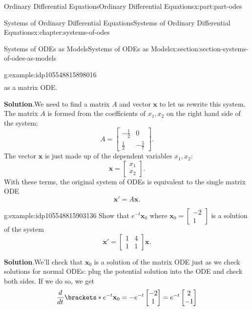\documentclass[twoside,10pt,]{book}
\newcommand{\blocktitlefont}{\relax}
\numberwithin{equation}{part}
\renewcommand{\vec}[1]{\mathbf{#1}}
\providecommand{\dv}[3][]{\dfrac{d^{#1} #2}{d #3^{#1}}}
\newcommand{\amp}{&}
\begin{document}
\begin{partptx}{Ordinary Differential Equations}{}{Ordinary Differential Equations}{}{}{x:part:part-odes}
\begin{chapterptx}{Systems of Ordinary Differential Equations}{}{Systems of Ordinary Differential Equations}{}{}{x:chapter:systems-of-odes}
\begin{sectionptx}{Systems of ODEs as Models}{}{Systems of ODEs as Models}{}{}{x:section:section-systems-of-odes-as-models}
\begin{example}{}{g:example:idp105548815898016}
\begin{align*}
\end{align*}
as a matrix ODE.%
\par\smallskip%
\noindent\textbf{\blocktitlefont Solution}.\hypertarget{g:solution:idp105548815899296}{}\quad{}We need to find a matrix \(A\) and vector \(\vec{x}\) to let us rewrite this system. The matrix \(A\) is formed from the coefficients of \(x_{1},x_{2}\) on the right hand side of the system:%
\begin{equation*}
A = \begin{bmatrix}-\frac{1}{2}\amp 0\\\frac{1}{2}\amp -\frac{5}{7}\end{bmatrix}.
\end{equation*}
The vector \(\vec{x}\) is just made up of the dependent variables \(x_{1},x_{2}\):%
\begin{equation*}
\vec{x} = \begin{bmatrix}x_{1}\\x_{2}\end{bmatrix}.
\end{equation*}
With these terms, the original system of ODEs is equivalent to the single matrix ODE%
\begin{equation*}
\vec{x}' = A\vec{x}.
\end{equation*}
%
\end{example}
\begin{example}{}{g:example:idp105548815903136}%
Show that \(e^{-t}\vec{x}_{0}\) where \(\vec{x}_{0} = \begin{bmatrix}-2\\1\end{bmatrix}\) is a solution of the system%
\begin{equation*}
\vec{x}' = \begin{bmatrix}1\amp 4\\1\amp 1\end{bmatrix}\vec{x}.
\end{equation*}
%
\par\smallskip%
\noindent\textbf{\blocktitlefont Solution}.\hypertarget{g:solution:idp105548815904800}{}\quad{}We'll check that \(\vec{x}_{0}\) is a solution of the matrix ODE just as we check solutions for normal ODEs: plug the potential solution into the ODE and check both sides. If we do so, we get%
\begin{equation*}
\dv{}{t}\brackets*{e^{-t}\vec{x}_{0}} = -e^{-t}\begin{bmatrix}-2\\1\end{bmatrix} = e^{-t}\begin{bmatrix}2\\-1\end{bmatrix}

\end{equation*}
\end{example}
\end{sectionptx}
\end{chapterptx}
\end{partptx}
\end{document}
